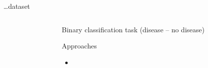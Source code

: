 

\begin{frame}{\dots dataset}

\begin{columns}[T]
\begin{column}{0.5\textwidth}

\end{column}
\begin{column}{0.5\textwidth}
Binary classification task (disease -- no disease)

Approaches
\begin{itemize}
	\item 
\end{itemize}
\end{column}
\end{columns}

\end{frame}
